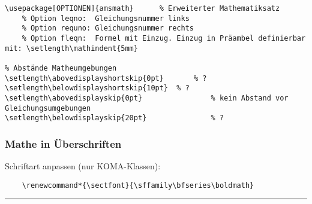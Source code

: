\noindent \begin{minipage}{\linewidth}
\negAbstand
\begin{lstlisting}
\usepackage[OPTIONEN]{amsmath}		% Erweiterter Mathematiksatz
	% Option leqno:  Gleichungsnummer links
	% Option requno: Gleichungsnummer rechts
	% Option fleqn:  Formel mit Einzug. Einzug in Präambel definierbar mit: \setlength\mathindent{5mm}
	
% Abstände Matheumgebungen
\setlength\abovedisplayshortskip{0pt}		% ?
\setlength\belowdisplayshortskip{10pt}	% ?
\setlength\abovedisplayskip{0pt}				% kein Abstand vor Gleichungsumgebungen
\setlength\belowdisplayskip{20pt}				% ?
\end{lstlisting}

\subsubsection*{Mathe in Überschriften }
Schriftart anpassen (nur KOMA-Klassen):
\begin{lstlisting}
	\renewcommand*{\sectfont}{\sffamily\bfseries\boldmath}
\end{lstlisting}

\end{minipage}


\hrule \vspace{0.5\baselineskip}


